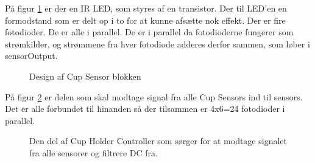 \documentclass[HardwareDesign/HardwareDesign_main.tex]{subfiles}
\begin{document}
På figur \ref{fig:CupSensorDesign} er der en IR LED, som styres af en transistor. Der til LED'en en formodstand som er delt op i to for at kunne afsætte nok effekt. Der er fire fotodioder. De er alle i parallel. De er i parallel da fotodioderne fungerer som strømkilder, og strømmene fra hver fotodiode adderes derfor sammen, som løber i sensorOutput.
\begin{figure}[H]
    \centering
    \caption{Design af Cup Sensor blokken}
    \label{fig:CupSensorDesign}
\end{figure}

På figur \ref{fig:CupSensorCupHolderControllerPart} er delen som skal modtage signal fra alle Cup Sensors ind til sensors. Det er alle forbundet til hinanden så der tilsammen er 4x6=24 fotodioder i parallel. 
\begin{figure}[H]
    \centering
    \caption{Den del af Cup Holder Controller som sørger for at modtage signalet fra alle sensorer og filtrere DC fra.}
    \label{fig:CupSensorCupHolderControllerPart}
\end{figure}
\end{document}

